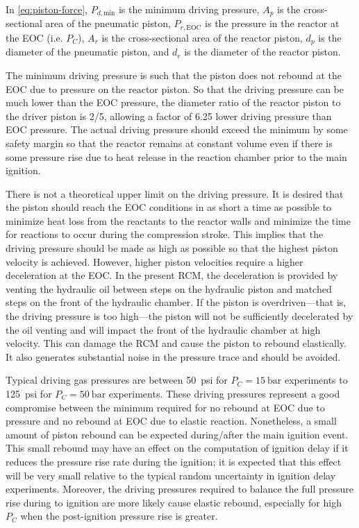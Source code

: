 \documentclass[../main.tex]{subfiles}
\begin{document}
In \autoref{eq:piston-force}, $P_{d,\text{min}}$ is the minimum
driving pressure, $A_p$ is the cross-sectional area of the pneumatic piston,
$P_{r,\text{EOC}}$ is the pressure in the reactor at the EOC (i.e. $P_C$),
$A_r$ is the cross-sectional area of the reactor piston, $d_p$ is the diameter
of the pneumatic piston, and $d_r$ is the diameter of the reactor piston.

The minimum driving pressure is such that the piston does not rebound at
the EOC due to pressure on the reactor piston. So that the driving
pressure can be much lower than the EOC pressure, the diameter ratio of
the reactor piston to the driver piston is \num{2/5}, allowing a factor of
\num{6.25} lower driving pressure than EOC pressure. The actual driving
pressure should exceed the minimum by some safety margin so that the
reactor remains at constant volume even if there is some pressure rise
due to heat release in the reaction chamber prior to the main ignition.

There is not a theoretical upper limit on the driving pressure. It is desired that the piston should
reach the EOC conditions in as short a time as possible to minimize heat
loss from the reactants to the reactor walls and minimize the time for
reactions to occur during the compression stroke. This implies that the
driving pressure should be made as high as possible so that the highest
piston velocity is achieved. However, higher piston velocities require
a higher deceleration at the EOC. In the present RCM, the deceleration
is provided by venting the hydraulic oil between steps on the hydraulic
piston and matched steps on the front of the hydraulic chamber. If the
piston is overdriven---that is, the driving pressure is too high---the
piston will not be sufficiently decelerated by the oil venting and will
impact the front of the hydraulic chamber at high velocity. This can damage
the RCM and cause the piston to rebound elastically. It also generates
substantial noise in the pressure trace and should be avoided.

Typical driving gas pressures are between \SI{50}{psi} for $P_C = \SI{15}{\bar}$ experiments
to  \SI{125}{psi} for $P_C = \SI{50}{\bar}$ experiments. These driving pressures represent a
good compromise between the minimum required for no rebound at EOC due
to pressure and no rebound at EOC due to elastic reaction. Nonetheless,
a small amount of piston rebound can be expected during/after the
main ignition event. This small rebound may have an effect on the computation of
ignition delay if it reduces the pressure rise rate during the ignition;
it is expected that this effect will be very small relative to the
typical random uncertainty in ignition delay experiments. Moreover,
the driving pressures required to balance the full pressure rise during
to ignition are more likely cause elastic rebound,
especially for high $P_C$ when the post-ignition pressure rise is greater.
\end{document}
